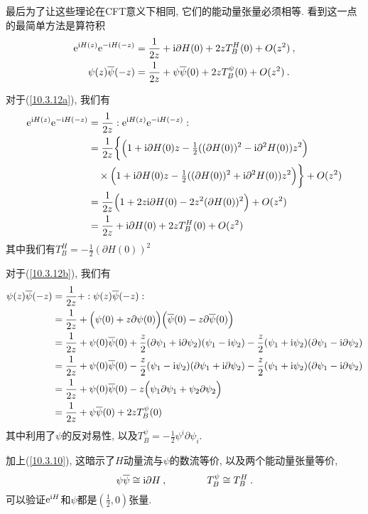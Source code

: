 最后为了让这些理论在CFT意义下相同, 它们的能动量张量必须相等. 看到这一点的最简单方法是算符积
\begin{subequations}
\begin{align}
    \mathrm{e}^{\mathrm{i} H(z)}\mathrm{e}^{-\mathrm{i} H(-z)} &= \frac{1}{2z} + \mathrm{i}\partial H(0)+2zT_{B}^{H}(0)+O(z^{2})\:, \label{10.3.12a} \\
    \psi(z)\overline{\psi}(-z) &= \frac{1}{2z} + \psi\overline{\psi}(0) +2zT_{B}^{\psi}(0) + O(z^{2}) \:. \label{10.3.12b}
\end{align} \label{10.3.12}
\end{subequations}
\begin{tcolorbox}[breakable]
对于(\ref{10.3.12a}), 我们有
\begin{align*}
    \mathrm{e}^{\mathrm{i} H(z)}\mathrm{e}^{-\mathrm{i} H(-z)} &= \frac{1}{2z} :  \mathrm{e}^{\mathrm{i} H(z)}\mathrm{e}^{-\mathrm{i} H(-z)} : \\
    &= \frac{1}{2z} \biggl\{ \Bigl(1+\mathrm{i}\partial H(0)z-\tfrac{1}{2}((\partial H(0))^{2} -\mathrm{i} \partial^{2} H(0))z^{2}\Bigr)\\
    &\quad\times\Bigl(1+\mathrm{i}\partial H(0)z-\tfrac{1}{2}((\partial H(0))^{2} +\mathrm{i} \partial^{2} H(0))z^{2}\Bigr) \biggr\}
    +O(z^{2}) \\
    & =\frac{1}{2z}\Bigl(1+ 2z\mathrm{i}\partial H(0)-2z^{2}(\partial H(0))^{2}\Bigr)+O(z^{2}) \\
    &=\frac{1}{2z} + \mathrm{i}\partial H(0)+2zT_{B}^{H}(0)+O(z^{2})
\end{align*} 
其中我们有$T_{B}^{H}=-\tfrac{1}{2}(\partial H(0))^{2}$

对于(\ref{10.3.12b}), 我们有
\begin{align*}
    \psi(z)\overline{\psi}(-z) &= \frac{1}{2z} + :\psi(z)\overline{\psi}(-z) : \\
    &= \frac{1}{2z} + \Bigl(\psi(0)+z\partial\psi(0)\Bigr) \Bigl(\overline{\psi}(0)-z\partial\overline{\psi}(0)\Bigr) \\
    &=\frac{1}{2z} +\psi(0)\overline{\psi}(0) +\frac{z}{2}(\partial\psi_{1}+\mathrm{i}\partial\psi_{2})(\psi_{1}-\mathrm{i}\psi_{2})
    -\frac{z}{2}(\psi_{1}+\mathrm{i}\psi_{2})(\partial\psi_{1}-\mathrm{i}\partial\psi_{2})\\
    &=\frac{1}{2z} +\psi(0)\overline{\psi}(0)-\frac{z}{2}(\psi_{1}-\mathrm{i}\psi_{2})(\partial\psi_{1}+\mathrm{i}\partial\psi_{2})
    -\frac{z}{2}(\psi_{1}+\mathrm{i}\psi_{2})(\partial\psi_{1}-\mathrm{i}\partial\psi_{2}) \\
    &= \frac{1}{2z} +\psi(0)\overline{\psi}(0)- z\Bigl(\psi_{1}\partial\psi_{1}+\psi_{2}\partial\psi_{2}\Bigr) \\
    &=\frac{1}{2z} + \psi\overline{\psi}(0) +2zT_{B}^{\psi}(0) 
\end{align*}
其中利用了$\psi$的反对易性, 以及$T_{B}^{\psi}=-\frac{1}{2}\psi^{i}\partial\psi_{i}$.
\end{tcolorbox}
加上(\ref{10.3.10}), 这暗示了$ H $动量流与$ \psi $的数流等价, 以及两个能动量张量等价,
\begin{equation}
    \psi\overline{\psi}\cong \mathrm{i}\partial H\:, \qquad \qquad 
    T_{B}^{\psi}\cong T_{B}^{H} \:. \label{10.3.13}
\end{equation}
可以验证$ \mathrm{e}^{\mathrm{i} H} $和$ \psi $都是$(\frac{1}{2},0)$张量.

